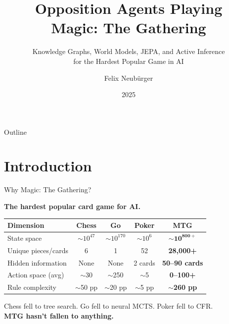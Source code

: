 \documentclass[aspectratio=169, 10pt]{beamer}
\title[Opposition Agents Playing MTG]{%
  Opposition Agents Playing\\Magic: The Gathering}
\subtitle{Knowledge Graphs, World Models, JEPA, and Active Inference\\
  for the Hardest Popular Game in AI}
\author{Felix Neub\"urger}
\date{2025}
\begin{document}
\begin{frame}
  \titlepage
\end{frame}

\begin{frame}{Outline}
  \tableofcontents
\end{frame}


\section{Introduction}

\begin{frame}{Why Magic: The Gathering?}
  \begin{center}
    \large\bfseries The hardest popular card game for AI.
  \end{center}
  \vspace{0.3cm}
  \begin{center}
  \begin{tabular}{@{}lcccc@{}}
    \toprule
    \textbf{Dimension} & \textbf{Chess} & \textbf{Go} & \textbf{Poker} & \textbf{MTG} \\
    \midrule
    State space         & $\sim10^{47}$  & $\sim10^{170}$ & $\sim10^{6}$   & $\mathbf{\sim10^{800+}}$ \\
    Unique pieces/cards & 6              & 1               & 52             & \textbf{28,000+} \\
    Hidden information  & None           & None            & 2 cards        & \textbf{50--90 cards} \\
    Action space (avg)  & $\sim$30       & $\sim$250       & $\sim$5        & \textbf{0--100+} \\
    Rule complexity     & $\sim$50 pp    & $\sim$20 pp     & $\sim$5 pp     & \textbf{$\sim$260 pp} \\
    \bottomrule
  \end{tabular}
  \end{center}
  \vspace{0.2cm}
  \begin{center}
    \footnotesize
    Chess fell to tree search. Go fell to neural MCTS. Poker fell to CFR.\\
    \textbf{MTG hasn't fallen to anything.}
  \end{center}
\end{frame}
\end{document}
